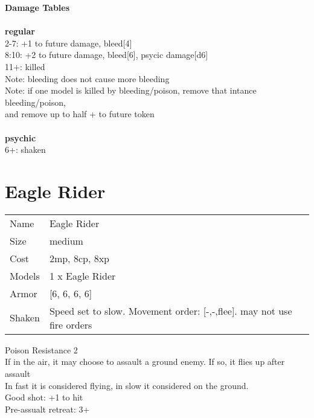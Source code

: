 {\bf Damage Tables} \\
\ \\ {\bf regular } \\
2-7: +1 to future damage, bleed[4] \\
8:10: +2 to future damage, bleed[6], psycic damage[d6] \\
11+: killed \\
Note: bleeding does not cause more bleeding \\
Note: if one model is killed by bleeding/poison, remove that intance bleeding/poison, \\ and remove up to half + to future token \\
\ \\ {\bf psychic } \\
6+: shaken \\










\pagebreak\pagebreak

\section{ Eagle Rider }

\begin{tabular}{ll}
  Name & Eagle Rider \\
  Size & medium\\
  Cost & 2mp, 8cp, 8xp\\
  Models & 1 x Eagle Rider\\
  Armor & [6, 6, 6, 6]\\
  Shaken & Speed set to slow. Movement order: [-,-,flee]. may not use fire orders\\
\end{tabular}

\noindent Poison Resistance 2\\ 
If in the air, it may choose to assault a ground enemy. If so, it flies up after assault\\ 
In fast it is considered flying, in slow it considered on the ground.\\ 
Good shot: +1 to hit\\ 
Pre-assualt retreat: 3+\\ 


